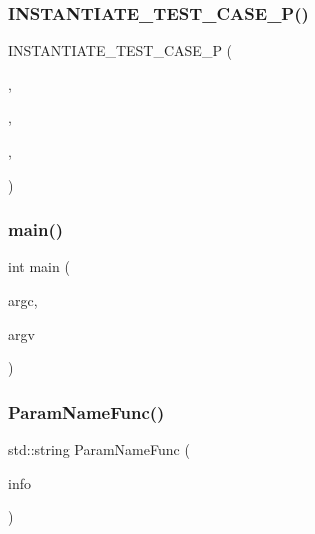 \subsubsection{\texorpdfstring{INSTANTIATE\_TEST\_CASE\_P()}{INSTANTIATE\_TEST\_CASE\_P()}\hspace{0.1cm}{\footnotesize\ttfamily [2/2]}}
{\footnotesize\ttfamily I\+N\+S\+T\+A\+N\+T\+I\+A\+T\+E\+\_\+\+T\+E\+S\+T\+\_\+\+C\+A\+S\+E\+\_\+P (\begin{DoxyParamCaption}\item[{Printing\+Strings}]{,  }\item[{\mbox{\hyperlink{classParamTest}{Param\+Test}}}]{,  }\item[{\mbox{\hyperlink{namespacetesting_a8209ef59db08b8ad4beed30d8d6e6a88}{testing\+::\+Values}}(std\+::string(\char`\"{}a\char`\"{}))}]{,  }\item[{\mbox{\hyperlink{googletest-output-test___8cc_a61c686cb1c0f8f19c100ff975482ec7a}{Param\+Name\+Func}}}]{ }\end{DoxyParamCaption})}

\mbox{\label{googletest-output-test___8cc_a3c04138a5bfe5d72780bb7e82a18e627}} 
\subsubsection{\texorpdfstring{main()}{main()}}
{\footnotesize\ttfamily int main (\begin{DoxyParamCaption}\item[{int}]{argc,  }\item[{char $\ast$$\ast$}]{argv }\end{DoxyParamCaption})}

\mbox{\label{googletest-output-test___8cc_a61c686cb1c0f8f19c100ff975482ec7a}} 
\subsubsection{\texorpdfstring{ParamNameFunc()}{ParamNameFunc()}}
{\footnotesize\ttfamily std\+::string Param\+Name\+Func (\begin{DoxyParamCaption}\item[{const \mbox{\hyperlink{structtesting_1_1TestParamInfo}{testing\+::\+Test\+Param\+Info}}$<$ std\+::string $>$ \&}]{info }\end{DoxyParamCaption})}

